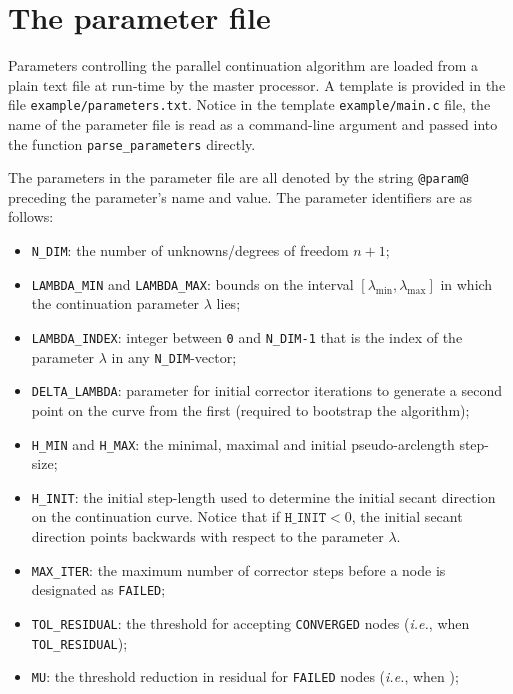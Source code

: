 \documentclass{article}
\renewcommand{\vec}[1]{{\mathbf{#1}}}
\newcommand{\norm}[1]{\ensuremath{\left\lVert #1 \right\rVert}}
\newcommand{\lambi}{\ensuremath{\lambda_{\mathrm{min}}}}
\newcommand{\lambf}{\ensuremath{\lambda_{\mathrm{max}}}}
\newcommand{\ie}{\textit{i.e.}}
\newcommand{\GREEN}{\texttt{CONVERGED}\xspace}
\newcommand{\BLACK}{\texttt{FAILED}\xspace}
\begin{document}
\section*{The parameter file}

Parameters controlling the parallel continuation algorithm are loaded
from a plain text file at run-time by the master processor.
A template is provided in the file \texttt{example/parameters.txt}.
%
Notice in the template \texttt{example/main.c} file, the name of the parameter file
is read as a command-line argument and passed into the function \verb.parse_parameters.
directly.

The parameters in the parameter file are all denoted by the string \verb.@param@. preceding
the parameter's name and value.
The parameter identifiers are as follows:
\begin{itemize}
\item \verb+N_DIM+: the number of unknowns/degrees of freedom $n+1$;
%
\item \verb+LAMBDA_MIN+ and \verb+LAMBDA_MAX+: bounds on the interval $[\lambi,\lambf]$ in which the continuation parameter $\lambda$ lies;
%
\item \verb+LAMBDA_INDEX+: integer between \texttt{0} and \verb+N_DIM-1+ that is the index of the parameter $\lambda$ in any \verb+N_DIM+-vector;
%
\item \verb+DELTA_LAMBDA+: parameter for initial corrector iterations to generate a second point on the curve from the first (required to bootstrap the algorithm);
%
\item \verb+H_MIN+ and \verb+H_MAX+: the minimal, maximal and initial pseudo-arclength step-size;
%
\item \verb+H_INIT+: the initial step-length used to determine the initial secant direction on the continuation curve.
Notice that if $\mathtt{H\_INIT}<0$, the initial secant direction points backwards with respect to the parameter $\lambda$.
%
\item \verb+MAX_ITER+: the maximum number of corrector steps before a node is designated as \BLACK;
%
\item \verb+TOL_RESIDUAL+: the threshold for accepting \GREEN nodes (\ie, when  \smash{$\norm{\vec{r}_{\alpha}^{(\nu_\alpha)}}_{2} \le\,$}\verb+TOL_RESIDUAL+);
%
\item \verb+MU+: the threshold reduction in residual for \BLACK nodes \newline
(\ie, when \smash{$\norm{\vec{r}_{\alpha}^{(\nu_\alpha)}}_{2} > \mathtt{MU} \norm{\vec{r}_{\alpha}^{(\nu_\alpha-1)}}_{2}$});

\end{itemize}
\end{document}
